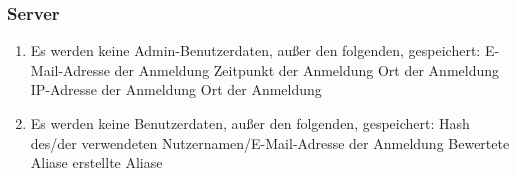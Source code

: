 \subsubsection{Server}

\begin{enumerate}
    \item Es werden keine Admin-Benutzerdaten, außer den folgenden, gespeichert:
        \subitem E-Mail-Adresse der Anmeldung
        \subitem Zeitpunkt der Anmeldung
        \subitem Ort der Anmeldung
        \subitem IP-Adresse der Anmeldung
        \subitem Ort der Anmeldung
    \item Es werden keine Benutzerdaten, außer den folgenden, gespeichert:
        \subitem Hash des/der verwendeten Nutzernamen/E-Mail-Adresse der Anmeldung
        \subitem Bewertete Aliase
        \subitem erstellte Aliase
\end{enumerate}